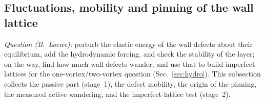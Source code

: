 \subsection{Fluctuations, mobility and pinning of the wall lattice}\label{sec:fluct}
\emph{Question (B.~Loewe):} perturb the elastic energy of the wall defects about their equilibrium, add the hydrodynamic forcing, and check the stability
of the layer; on the way, find how much wall defects wander, and use that to build imperfect lattices for the one-vortex/two-vortex question
(Sec.~\ref{sec:hydro}). This subsection collects the passive part (stage~1), the defect mobility, the origin of the pinning, the measured active
wandering, and the imperfect-lattice test (stage~2).

